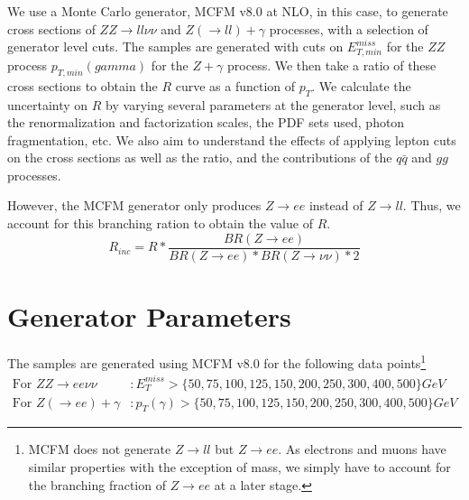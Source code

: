 \documentclass[11pt,a4paper,final]{report}
\newcommand{\ZZ}{$ZZ\rightarrow ll\nu\nu$ }
\newcommand{\Zgam}{$Z(\rightarrow ll)+\gamma$ }
\begin{document}
We use a Monte Carlo generator, MCFM v8.0 \cite{MCFM} at NLO, in this case, to generate cross sections of \ZZ and \Zgam processes, with a selection of generator level cuts. The samples are generated with cuts on $E_{T,min}^{miss}$ for the $ZZ$ process $p_{T,min}(gamma)$ for the $Z+\gamma$ process. We then take a ratio of these cross sections to obtain the $R$ curve as a function of $p_T$. We calculate the uncertainty on $R$ by varying several parameters at the generator level, such as the renormalization and factorization scales, the PDF sets used, photon fragmentation, etc. We also aim to understand the effects of applying lepton cuts on the cross sections as well as the ratio, and the contributions of the $q \bar{q}$ and $gg$ processes.

However, the MCFM generator only produces $Z\rightarrow ee$ instead of $Z\rightarrow ll$. Thus, we account for this branching ration to obtain the value of $R$.
\begin{equation}\label{eq:R_inc}
	R_{inc} = R * \frac{BR(Z\rightarrow ee)}{BR(Z \rightarrow ee)*BR(Z\rightarrow \nu\nu)*2}
\end{equation}

\section{Generator Parameters}
The samples are generated using MCFM v8.0 for the following data points\footnote{MCFM does not generate $Z\rightarrow ll$ but $Z\rightarrow ee$. As electrons and muons have similar properties with the exception of mass, we simply have to account for the branching fraction of $Z\rightarrow ee$ at a later stage.}
\begin{align*}
	\text{For } ZZ \rightarrow ee\nu\nu &: E_T^{miss} > \{50,75,100,125,150,200,250,300,400,500\} GeV \\
	\text{For } Z(\rightarrow ee)+\gamma &: p_T(\gamma) > \{50,75,100,125,150,200,250,300,400,500\} GeV
\end{align*}
\end{document}
